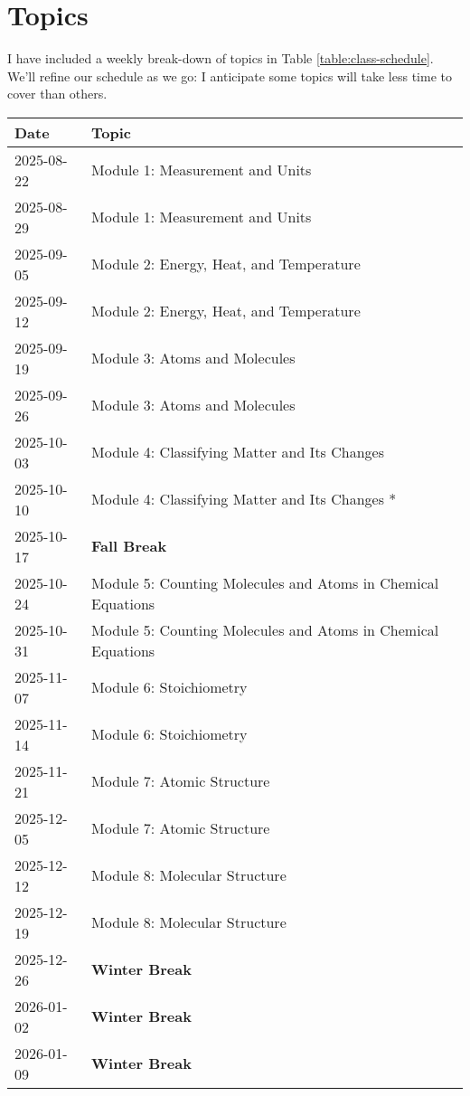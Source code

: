 \documentclass[11pt, oneside]{article}   	%
\begin{document}
\section{Topics}
I have included a weekly break-down of topics in Table \ref{table:class-schedule}.
We'll refine our schedule as we go: I anticipate some topics will take less time to cover than others.

\begin{table}[h]
\centering
\begin{tabular}{ l | l }
Date & Topic \\
\hline
2025-08-22 & Module 1:  Measurement and Units \\
2025-08-29 & Module 1:  Measurement and Units \\
2025-09-05 & Module 2: Energy, Heat, and Temperature \\
2025-09-12 & Module 2: Energy, Heat, and Temperature \\
2025-09-19 & Module 3: Atoms and Molecules \\
2025-09-26 & Module 3: Atoms and Molecules \\
2025-10-03 & Module 4: Classifying Matter and Its Changes \\
2025-10-10 & Module 4: Classifying Matter and Its Changes * \\

2025-10-17 & \textbf{Fall Break} \\

2025-10-24 & Module 5: Counting Molecules and Atoms in Chemical Equations \\
2025-10-31 & Module 5: Counting Molecules and Atoms in Chemical Equations \\
2025-11-07 & Module 6: Stoichiometry \\
2025-11-14 & Module 6: Stoichiometry \\
2025-11-21 & Module 7: Atomic Structure \\
2025-12-05 & Module 7: Atomic Structure \\
2025-12-12 & Module 8: Molecular Structure \\
2025-12-19 & Module 8: Molecular Structure \\

2025-12-26  & \textbf{Winter Break} \\
2026-01-02  & \textbf{Winter Break} \\
2026-01-09  & \textbf{Winter Break} \\


\end{tabular}
\end{table}
\end{document}
